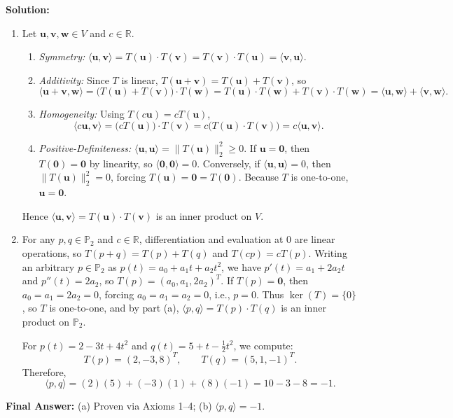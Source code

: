 \documentclass[11pt, letterpaper]{article}
\theoremstyle{definition}
\theoremstyle{remark}
\begin{document}
\textbf{Solution:}
\begin{enumerate}[label=(\alph*)]
    \item Let $\mathbf{u}, \mathbf{v}, \mathbf{w} \in V$ and $c \in \mathbb{R}$.
    \begin{enumerate}
        \item \emph{Symmetry:} $\langle \mathbf{u}, \mathbf{v} \rangle = T(\mathbf{u}) \cdot T(\mathbf{v}) = T(\mathbf{v}) \cdot T(\mathbf{u}) = \langle \mathbf{v}, \mathbf{u} \rangle$.
        \item \emph{Additivity:} Since $T$ is linear, $T(\mathbf{u} + \mathbf{v}) = T(\mathbf{u}) + T(\mathbf{v})$, so
        \[
        \langle \mathbf{u} + \mathbf{v}, \mathbf{w} \rangle = \big(T(\mathbf{u}) + T(\mathbf{v})\big)\cdot T(\mathbf{w}) = T(\mathbf{u})\cdot T(\mathbf{w}) + T(\mathbf{v})\cdot T(\mathbf{w}) = \langle \mathbf{u}, \mathbf{w} \rangle + \langle \mathbf{v}, \mathbf{w} \rangle.
        \]
        \item \emph{Homogeneity:} Using $T(c\mathbf{u}) = cT(\mathbf{u})$,
        \[
        \langle c\mathbf{u}, \mathbf{v} \rangle = \big(cT(\mathbf{u})\big) \cdot T(\mathbf{v}) = c\big(T(\mathbf{u}) \cdot T(\mathbf{v})\big) = c\langle \mathbf{u}, \mathbf{v} \rangle.
        \]
        \item \emph{Positive-Definiteness:} $\langle \mathbf{u}, \mathbf{u} \rangle = \|T(\mathbf{u})\|_2^2 \ge 0$. If $\mathbf{u} = \mathbf{0}$, then $T(\mathbf{0}) = \mathbf{0}$ by linearity, so $\langle \mathbf{0}, \mathbf{0} \rangle = 0$. Conversely, if $\langle \mathbf{u}, \mathbf{u} \rangle = 0$, then $\|T(\mathbf{u})\|_2^2 = 0$, forcing $T(\mathbf{u}) = \mathbf{0} = T(\mathbf{0})$. Because $T$ is one-to-one, $\mathbf{u} = \mathbf{0}$.
    \end{enumerate}
    Hence $\langle \mathbf{u}, \mathbf{v} \rangle = T(\mathbf{u}) \cdot T(\mathbf{v})$ is an inner product on $V$.
    \item For any $p, q \in \mathbb{P}_2$ and $c \in \mathbb{R}$, differentiation and evaluation at $0$ are linear operations, so $T(p + q) = T(p) + T(q)$ and $T(cp) = cT(p)$. Writing an arbitrary $p \in \mathbb{P}_2$ as $p(t) = a_0 + a_1 t + a_2 t^2$, we have $p'(t) = a_1 + 2a_2 t$ and $p''(t) = 2a_2$, so $T(p) = (a_0, a_1, 2a_2)^T$. If $T(p) = \mathbf{0}$, then $a_0 = a_1 = 2a_2 = 0$, forcing $a_0 = a_1 = a_2 = 0$, i.e., $p = 0$. Thus $\ker(T) = \{0\}$, so $T$ is one-to-one, and by part (a), $\langle p, q \rangle = T(p)\cdot T(q)$ is an inner product on $\mathbb{P}_2$.

    For $p(t) = 2 - 3t + 4t^2$ and $q(t) = 5 + t - \frac{1}{2}t^2$, we compute:
    \[
    T(p) = (2, -3, 8)^T, \qquad T(q) = (5, 1, -1)^T.
    \]
    Therefore,
    \[
    \langle p, q \rangle = (2)(5) + (-3)(1) + (8)(-1) = 10 - 3 - 8 = -1.
    \]
\end{enumerate}
\textbf{Final Answer:} (a) Proven via Axioms 1--4; (b) $\langle p, q \rangle = -1$.
\end{document}
